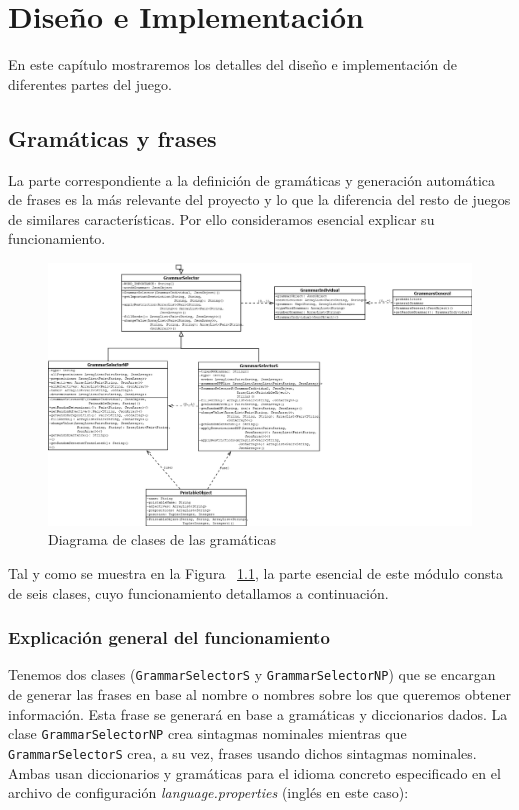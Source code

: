 \chapter{Diseño e Implementación}

En este capítulo mostraremos los detalles del diseño e implementación de diferentes partes del juego.

\section{Gramáticas y frases}

La parte correspondiente a la definición de gramáticas y generación automática de frases es la más relevante del proyecto y lo que la diferencia del resto de juegos de similares características. Por ello consideramos esencial explicar su funcionamiento.

\begin{figure}
    \includegraphics[width=1.5\textwidth,height=1.5\textheight,keepaspectratio,angle=90]{./img/grammarDiagram.png}
  \caption{Diagrama de clases de las gramáticas}
  \label{fig:clasesgramaticas}
\end{figure}

Tal y como se muestra en la Figura ~\ref{fig:clasesgramaticas}, la parte esencial de este módulo consta de seis clases, cuyo funcionamiento detallamos a continuación.

\subsection{Explicación general del funcionamiento}

Tenemos dos clases (\texttt{GrammarSelectorS} y \texttt{GrammarSelectorNP}) que se encargan de generar las frases en base al nombre o nombres sobre los que queremos obtener información. Esta frase se generará en base a gramáticas y diccionarios dados. La clase \texttt{GrammarSelectorNP} crea sintagmas nominales mientras que \texttt{GrammarSelectorS} crea, a su vez, frases usando dichos sintagmas nominales. Ambas usan diccionarios y gramáticas para el idioma concreto especificado en el archivo de configuración \textit{language.properties} (inglés en este caso):

